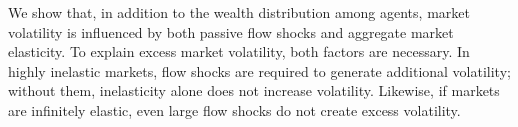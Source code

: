 We show that, in addition to the wealth distribution among agents, market volatility is influenced by both passive flow shocks and aggregate market elasticity. To explain excess market volatility, both factors are necessary. In highly inelastic markets, flow shocks are required to generate additional volatility; without them, inelasticity alone does not increase volatility. Likewise, if markets are infinitely elastic, even large flow shocks do not create excess volatility.

